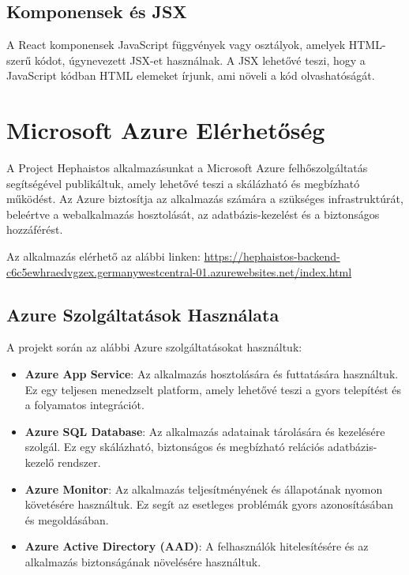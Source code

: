 \documentclass[colorlinks]{thesis-kando}
\theoremstyle{definition}
\theoremstyle{remark}
\begin{document}
\subsection{Komponensek és JSX}
A React komponensek JavaScript függvények vagy osztályok, amelyek HTML-szerű kódot, úgynevezett JSX-et használnak. A JSX lehetővé teszi, hogy a JavaScript kódban HTML elemeket írjunk, ami növeli a kód olvashatóságát.

\section*{Microsoft Azure Elérhetőség}
A Project Hephaistos alkalmazásunkat a Microsoft Azure felhőszolgáltatás segítségével publikáltuk, amely lehetővé teszi a skálázható és megbízható működést. Az Azure biztosítja az alkalmazás számára a szükséges infrastruktúrát, beleértve a webalkalmazás hosztolását, az adatbázis-kezelést és a biztonságos hozzáférést.

Az alkalmazás elérhető az alábbi linken:  
\url{https://hephaistos-backend-c6c5ewhraedvgzex.germanywestcentral-01.azurewebsites.net/index.html}

\subsection*{Azure Szolgáltatások Használata}
A projekt során az alábbi Azure szolgáltatásokat használtuk:
\begin{itemize}
    \item \textbf{Azure App Service}: Az alkalmazás hosztolására és futtatására használtuk. Ez egy teljesen menedzselt platform, amely lehetővé teszi a gyors telepítést és a folyamatos integrációt.
    \item \textbf{Azure SQL Database}: Az alkalmazás adatainak tárolására és kezelésére szolgál. Ez egy skálázható, biztonságos és megbízható relációs adatbázis-kezelő rendszer.
    \item \textbf{Azure Monitor}: Az alkalmazás teljesítményének és állapotának nyomon követésére használtuk. Ez segít az esetleges problémák gyors azonosításában és megoldásában.
    \item \textbf{Azure Active Directory (AAD)}: A felhasználók hitelesítésére és az alkalmazás biztonságának növelésére használtuk.
\end{itemize}
\end{document}
